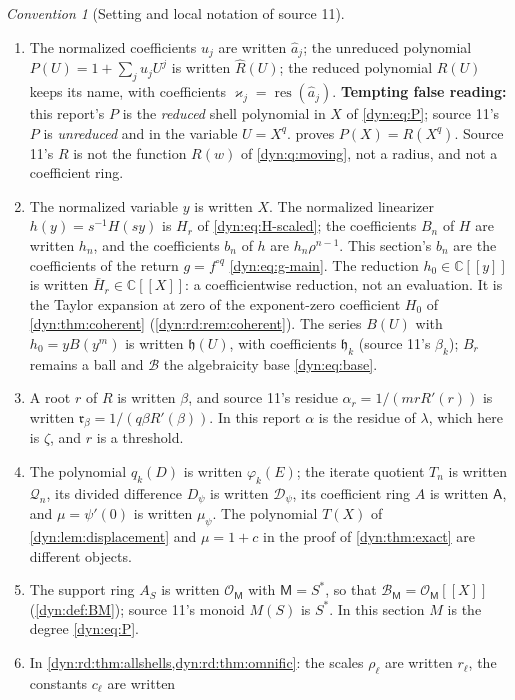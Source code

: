 \documentclass[11pt,letterpaper]{article}
\theoremstyle{definition}
\theoremstyle{remark}
\newtheorem{convention}[convention]{Convention}
\newcommand{\C}{\mathbb C}
\newcommand{\OO}{\mathcal O}
\newcommand{\BB}{\mathscr B}
\newcommand{\res}{\operatorname{res}}
\numberwithin{equation}{section}
\begin{document}
\begin{convention}[Setting and local notation of source 11]
\begin{enumerate}[label=(\roman*)]
the two are not identified.
\item The normalized coefficients $u_j$ are written $\hat a_j$; the
unreduced polynomial $P(U)=1+\sum_ju_jU^{j}$ is written $\widehat R(U)$; the
reduced polynomial $R(U)$ keeps its name, with coefficients
$\varkappa_j=\res(\hat a_j)$. \textbf{Tempting false reading:} this
report's $P$ is the \emph{reduced} shell polynomial in $X$ of
\eqref{dyn:eq:P}; source 11's $P$ is \emph{unreduced} and in the variable
$U=X^{q}$.  proves $P(X)=R(X^{q})$. Source 11's
$R$ is not the function $R(w)$ of \cref{dyn:q:moving}, not a radius, and
not a coefficient ring.
\item The normalized variable $y$ is written $X$. The normalized linearizer
$h(y)=s^{-1}H(sy)$ is $H_r$ of \eqref{dyn:eq:H-scaled}; the coefficients
$B_n$ of $H$ are written $h_n$, and the coefficients $b_n$ of $h$ are
$h_n\rho^{n-1}$. This section's $b_n$ are the coefficients of the return
$g=f^{\circ q}$ \eqref{dyn:eq:g-main}. The reduction $h_0\in\C[[y]]$ is
written $\bar H_r\in\C[[X]]$: a coefficientwise reduction, not an
evaluation. It is the Taylor expansion at zero of the exponent-zero
coefficient $H_0$ of \cref{dyn:thm:coherent} (\cref{dyn:rd:rem:coherent}).
The series $B(U)$ with $h_0=yB(y^{m})$ is written $\mathfrak h(U)$, with
coefficients $\mathfrak h_k$ (source 11's $\beta_k$); $B_r$ remains a ball
and $\BB$ the algebraicity base \eqref{dyn:eq:base}.
\item A root $r$ of $R$ is written $\beta$, and source 11's residue
$\alpha_r=1/(mrR'(r))$ is written
$\mathfrak r_\beta=1/(q\beta R'(\beta))$. In this report $\alpha$ is the
residue of $\lambda$, which here is $\zeta$, and $r$ is a threshold.
\item The polynomial $q_k(D)$ is written $\varphi_k(E)$; the iterate
quotient $T_n$ is written $\mathcal Q_n$, its divided difference $D_\psi$ is
written $\mathcal D_\psi$, its coefficient ring $A$ is written $\mathsf A$,
and $\mu=\psi'(0)$ is written $\mu_\psi$. The polynomial $T(X)$ of
\cref{dyn:lem:displacement} and $\mu=1+c$ in the proof of
\cref{dyn:thm:exact} are different objects.
\item The support ring $A_S$ is written $\OO_{\mathsf M}$ with
$\mathsf M=S^{*}$, so that $\BB_{\mathsf M}=\OO_{\mathsf M}[[X]]$
(\cref{dyn:def:BM}); source 11's monoid $M(S)$ is $S^{*}$. In this section
$M$ is the degree \eqref{dyn:eq:P}.
\item In \cref{dyn:rd:thm:allshells,dyn:rd:thm:omnific}: the scales
$\rho_\ell$ are written $r_\ell$, the constants $c_\ell$ are written

\end{enumerate}
\end{convention}
\end{document}
